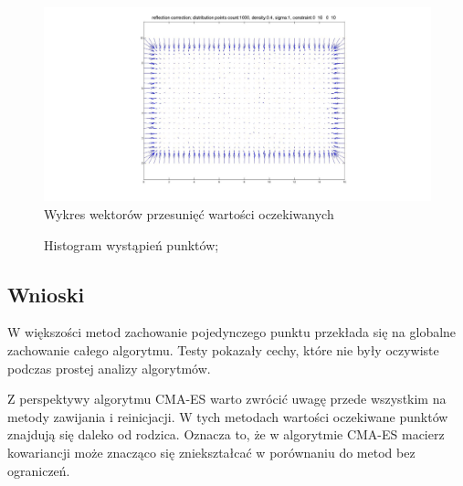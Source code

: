 \documentclass{mini}
\begin{document}
\begin{figure}[H]
\centering
\includegraphics[width=\textwidth]{reflection2dprzesuniecie}
\caption{Wykres wektorów przesunięć wartości oczekiwanych}
\end{figure}

\begin{figure}[H]
\centering
{}
\quad
{}
\caption{Histogram wystąpień punktów;}
\end{figure}

\subsection{Wnioski}
W większości metod zachowanie pojedynczego punktu przekłada się na globalne zachowanie całego algorytmu. Testy pokazały cechy, które nie były oczywiste podczas prostej analizy algorytmów.

Z perspektywy algorytmu CMA-ES warto zwrócić uwagę przede wszystkim na metody zawijania i reinicjacji. W tych metodach wartości oczekiwane punktów znajdują się daleko od rodzica. Oznacza to, że w algorytmie CMA-ES macierz kowariancji może znacząco się zniekształcać w porównaniu do metod bez ograniczeń.
\end{document}
